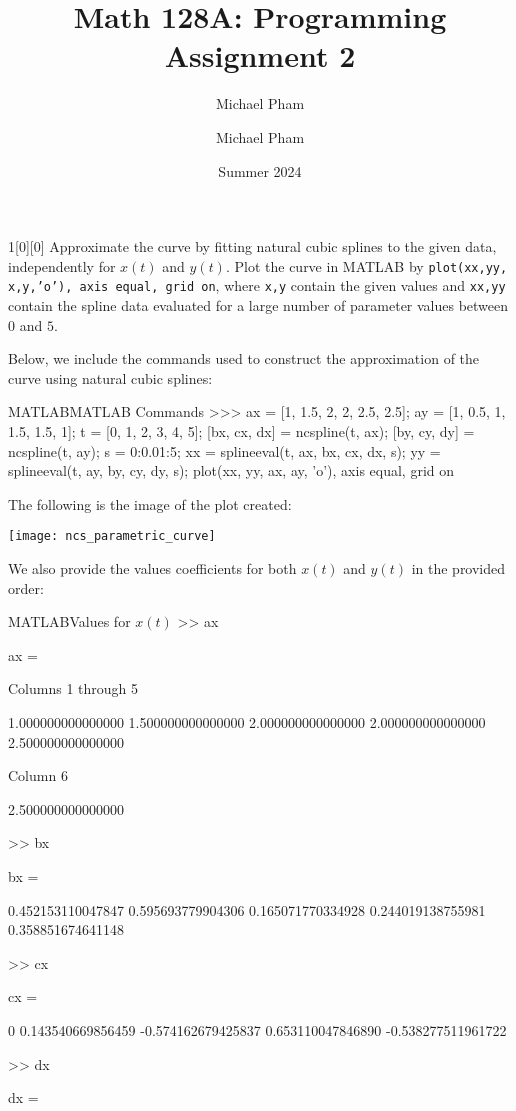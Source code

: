 \documentclass{article}
\title{#1}
\author{Michael Pham}
\date{#2}
\renewcommand{\mytitle}[2]{%
	\title{#1}
	\author{Michael Pham}
	\date{#2}
	\maketitle
	\newpage
	\listoftheorems
	\newpage
}
\begin{document}
\mytitle{Math 128A: Programming Assignment 2}{Summer 2024}

\setcounter{section}{1}

\begin{hw}{1}[0][0]
	Approximate the curve by fitting natural cubic splines to the given data, independently for $x(t)$ and $y(t)$. Plot the curve in MATLAB by
	\texttt{plot(xx,yy, x,y,'o'), axis equal, grid on},
	where \texttt{x,y} contain the given values and \texttt{xx,yy} contain the spline data evaluated for a large number of parameter values between $0$ and $5$.
\end{hw}
\begin{solution}
Below, we include the commands used to construct the approximation of the curve using natural cubic splines:
\begin{code}{MATLAB}{MATLAB Commands}
>>> ax = [1, 1.5, 2, 2, 2.5, 2.5];
ay = [1, 0.5, 1, 1.5, 1.5, 1];
t = [0, 1, 2, 3, 4, 5];
[bx, cx, dx] = ncspline(t, ax);
[by, cy, dy] = ncspline(t, ay);
s = 0:0.01:5;
xx = splineeval(t, ax, bx, cx, dx, s);
yy = splineeval(t, ay, by, cy, dy, s);
plot(xx, yy, ax, ay, 'o'), axis equal, grid on
\end{code}

The following is the image of the plot created:
\begin{center}
\texttt{[image: ncs\_parametric\_curve]}
\end{center}

We also provide the values coefficients for both $x(t)$ and $y(t)$ in the provided order:
\begin{code}{MATLAB}{Values for $x(t)$}
>> ax

ax =

Columns 1 through 5

1.000000000000000   1.500000000000000   2.000000000000000   2.000000000000000   2.500000000000000

Column 6

2.500000000000000

>> bx

bx =

0.452153110047847   0.595693779904306   0.165071770334928   0.244019138755981   0.358851674641148

>> cx

cx =

0   0.143540669856459  -0.574162679425837   0.653110047846890  -0.538277511961722

>> dx

dx =


\end{code}
\end{solution}
\end{document}
